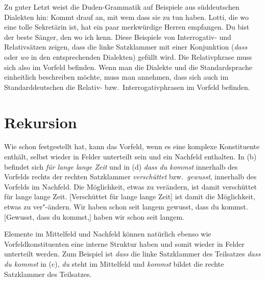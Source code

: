 Zu guter Letzt weist die Duden-Grammatik \citep[§1347]{Duden2005-Authors} auf Beispiele aus
süddeutschen Dialekten hin:
\ea
Kommt drauf an, mit wem dass sie zu tun haben.
\z
\eal
\ex Lotti, die wo eine tolle Sekretärin ist, hat ein paar merkwürdige Herren empfangen.
\ex Du bist der beste Sänger, den wo ich kenn.
\zl
Diese Beispiele von Interrogativ- und Relativsätzen zeigen, dass die linke Satzklammer mit einer
Konjunktion (\emph{dass} oder \emph{wo} in den entsprechenden Dialekten) gefüllt wird. Die
Relativphrase muss sich also im Vorfeld befinden. Wenn man die Dialekte und die Standardsprache
einheitlich beschreiben möchte, muss man annehmen, dass sich auch im Standarddeutschen die Relativ-
bzw.\ Interrogativphrasen im Vorfeld befinden. 


\section{Rekursion}
\label{sec-topo-rekursion}

Wie schon \citet[]{Reis80a} festgestellt hat, kann das Vorfeld,
wenn es eine komplexe Konstituente enthält, selbst wieder
in Felder unterteilt sein und \zb ein Nachfeld enthalten.
In (b) befindet sich \emph{für lange lange Zeit} und in
(d) \emph{dass du kommst} innerhalb des Vorfelds rechts der
rechten Satzklammer \emph{verschüttet} bzw.\ \emph{gewusst}, \dash
innerhalb des Vorfelds im Nachfeld.
\eal
\ex Die Möglichkeit, etwas zu verändern, ist damit verschüttet
      für lange lange Zeit.
\ex {}[Verschüttet für lange lange Zeit] ist damit die Möglichkeit, 
      etwas zu ver"-ändern.
\ex Wir haben schon seit langem gewusst, dass du kommst.
\ex {}[Gewusst, dass du kommst,] haben wir schon seit langem.
\zl

\noindent
Elemente im Mittelfeld und Nachfeld können natürlich ebenso wie
Vorfeldkonstituenten eine interne Struktur haben und somit wieder
in Felder unterteilt werden. Zum Beispiel ist \emph{dass} die linke Satzklammer des Teilsatzes
\emph{dass du kommst} in (c), \emph{du} steht im Mittelfeld und \emph{kommst} bildet die
rechte Satzklammer des Teilsatzes.%




